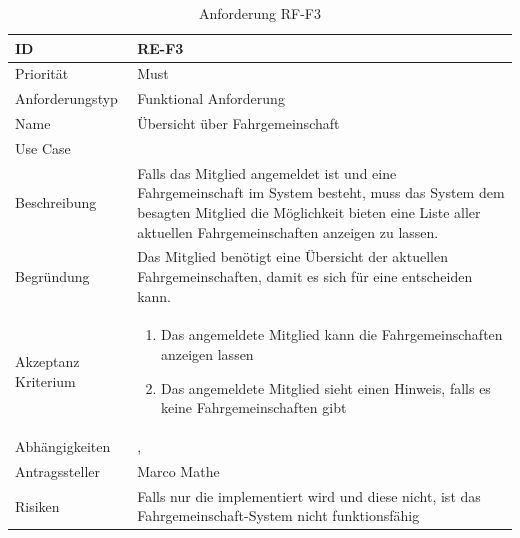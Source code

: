 \begin{table}[ht]
\centering
  \begin{tabular}{ l | p{8cm} }
	\hline
	\rowcolor{gray}
	ID 			&	\textbf{RE-F3}\\ \hline
	Priorität 		&	Must\\ \hline
	Anforderungstyp	&	Funktional Anforderung\\ \hline
	Name 			&	Übersicht über Fahrgemeinschaft\\ \hline
	Use Case 		&	\nameref{table:use_case_2}\\ \hline
	Beschreibung 	&	Falls das Mitglied angemeldet ist und eine Fahrgemeinschaft im System besteht, muss das System dem besagten Mitglied die Möglichkeit bieten eine Liste aller aktuellen Fahrgemeinschaften anzeigen zu lassen.\\ \hline
	Begründung 		&	Das Mitglied benötigt eine Übersicht der aktuellen Fahrgemeinschaften, damit es sich für eine entscheiden kann.\\ \hline
	Akzeptanz Kriterium	&	\begin{enumerate}
					\item Das angemeldete Mitglied kann die Fahrgemeinschaften anzeigen lassen
					\item Das angemeldete Mitglied sieht einen Hinweis, falls es keine Fahrgemeinschaften gibt
					\end{enumerate}
					\\ \hline
	Abhängigkeiten 	&	\nameref{table:req_1}, \nameref{table:req_2}\\ \hline
	Antragssteller 	&	Marco Mathe\\ \hline
	Risiken	 	&	Falls nur die \nameref{table:req_2} implementiert wird und diese nicht, ist das Fahrgemeinschaft-System nicht funktionsfähig
  \end{tabular}
   \caption{Anforderung RF-F3}\label{table:req_3}
\end{table}

